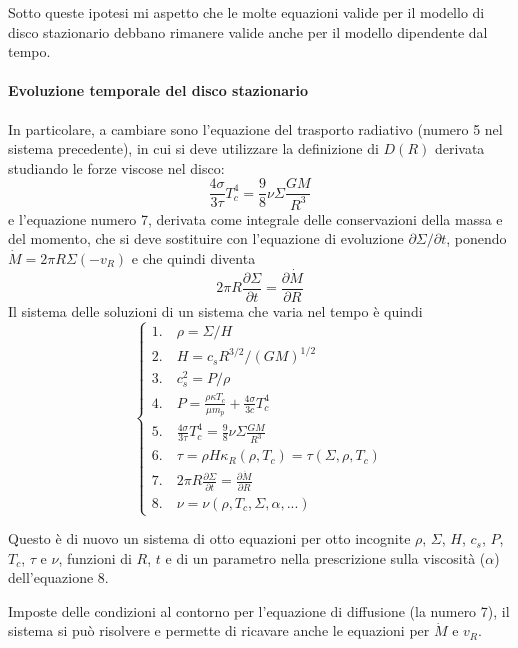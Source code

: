 \documentclass[a4paperbi]{article}
\begin{document}
	Sotto queste ipotesi mi aspetto che le molte equazioni valide per il modello di disco stazionario debbano rimanere valide anche per il modello dipendente dal tempo. 
	
	\paragraph{Evoluzione temporale del disco stazionario}
	In particolare, a cambiare sono l'equazione del trasporto radiativo (numero 5 nel sistema precedente), in cui si deve utilizzare la definizione di $D(R)$ derivata studiando le forze viscose nel disco:
	\begin{equation}
		\frac{4\sigma}{3\tau}T_c^4=\frac{9}{8}\nu\Sigma\frac{GM}{R^3}
	\end{equation}
	e l'equazione numero 7, derivata come integrale delle conservazioni della massa e del momento, che si deve sostituire con l'equazione di evoluzione $\partial \Sigma/\partial t$, ponendo $\dot{M}=2\pi R\Sigma(-v_R)$ e che quindi diventa
	\begin{equation}
		2\pi R\frac{\partial \Sigma}{\partial t}=\frac{\partial\dot{M}}{\partial R}
	\end{equation}
	Il sistema delle soluzioni di un sistema che varia nel tempo è quindi
	\begin{equation}
	\begin{cases}
		1.\quad \rho=\Sigma/H\\
		2.\quad H=c_sR^{3/2}/(GM)^{1/2}\\
		3.\quad c_s^2=P/\rho\\
		4.\quad P=\frac{\rho\kappa T_c}{\mu m_p}+\frac{4\sigma}{3c}T_c^4\\
		5.\quad \frac{4\sigma}{3\tau}T_c^4=\frac{9}{8}\nu\Sigma\frac{GM}{R^3}\\
		6.\quad \tau=\rho H\kappa_R(\rho,T_c)=\tau(\Sigma,\rho,T_c)\\
		7.\quad 2\pi R\frac{\partial \Sigma}{\partial t}=\frac{\partial\dot{M}}{\partial R}\\
		8.\quad \nu=\nu(\rho,T_c,\Sigma,\alpha,...)		
	\end{cases}
	\end{equation}
	
	Questo è di nuovo un sistema di otto equazioni per otto incognite $\rho$, $\Sigma$, $H$, $c_s$, $P$, $T_c$, $\tau$ e $\nu$, funzioni di $R$, $t$ e di un parametro nella prescrizione sulla viscosità ($\alpha$) dell'equazione 8. 
	
	Imposte delle condizioni al contorno per l'equazione di diffusione (la numero 7), il sistema si può risolvere e permette di ricavare anche le equazioni per $\dot{M}$ e $v_R$.
	
\end{document}
